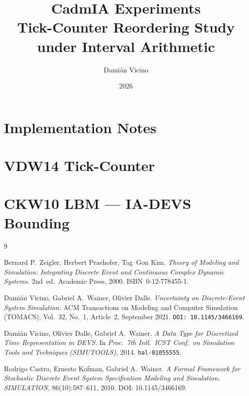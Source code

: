 \documentclass[11pt,a4paper]{article}
\title{CadmIA Experiments\\
  \large Tick-Counter Reordering Study under Interval Arithmetic}
\author{Damián Vicino}
\date{2026}
\begin{document}
\maketitle
\tableofcontents
\clearpage

\section{Implementation Notes}


\clearpage
\section{VDW14 Tick-Counter}


\clearpage
\section{CKW10 LBM --- IA-DEVS Bounding}
\label{sec:ckw10-lbm-ia}


\begin{thebibliography}{9}

  Bernard P.\ Zeigler, Herbert Praehofer, Tag~Gon Kim.
  \textit{Theory of Modeling and Simulation: Integrating Discrete Event and
  Continuous Complex Dynamic Systems.}
  2nd~ed.\ Academic Press, 2000.
  ISBN~0-12-778455-1.

  Damián Vicino, Gabriel A.\ Wainer, Olivier Dalle.
  \textit{Uncertainty on Discrete-Event System Simulation.}
  ACM Transactions on Modeling and Computer Simulation (TOMACS),
  Vol.~32, No.~1, Article~2, September 2021.
  \texttt{DOI:~10.1145/3466169}.

  Damián Vicino, Olivier Dalle, Gabriel A.\ Wainer.
  \textit{A Data Type for Discretized Time Representation in DEVS.}
  In \textit{Proc.\ 7th Intl.\ ICST Conf.\ on Simulation Tools and
  Techniques (SIMUTOOLS)}, 2014.
  \texttt{hal-01055555}.

  Rodrigo Castro, Ernesto Kofman, Gabriel A.\ Wainer.
  \textit{A Formal Framework for Stochastic Discrete Event System Specification
  Modeling and Simulation.}
  \textit{SIMULATION}, 86(10):587--611, 2010.
  DOI: 10.1145/3466169.

\end{thebibliography}
\end{document}
